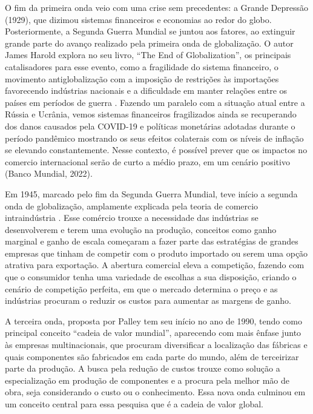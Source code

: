 \documentclass[12pt]{article}
\begin{document}
O fim da primeira onda veio com uma crise sem precedentes: a Grande Depressão (1929), que dizimou sistemas financeiros e economias ao redor do globo. Posteriormente, a Segunda Guerra Mundial se juntou aos fatores, ao extinguir grande parte do avanço realizado pela primeira onda de globalização. O autor James Harold explora no seu livro, “The End of Globalization”, os principais catalisadores para esse evento, como a fragilidade do sistema financeiro, o movimento antiglobalização com a imposição de restrições às importações favorecendo indústrias nacionais e a dificuldade em manter relações entre os países em períodos de guerra \cite{harold02}. 
Fazendo um paralelo com a situação atual entre a Rússia e Ucrânia, vemos sistemas financeiros fragilizados ainda se recuperando dos danos causados pela COVID-19 e políticas monetárias adotadas durante o período pandêmico mostrando os seus efeitos colaterais com os níveis de inflação se elevando constantemente. Nesse contexto, é possível prever que os impactos no comercio internacional serão de curto a médio prazo, em um cenário positivo (Banco Mundial, 2022).

Em 1945, marcado pelo fim da Segunda Guerra Mundial, teve início a segunda onda de globalização, amplamente explicada pela teoria de comercio intraindústria \cite{palley2018three}. Esse comércio trouxe a necessidade das indústrias se desenvolverem e terem uma evolução na produção, conceitos como ganho marginal e ganho de escala começaram a fazer parte das estratégias de grandes empresas que tinham de competir com o produto importado ou serem uma opção atrativa para exportação. A abertura comercial eleva a competição, fazendo com que o consumidor tenha uma variedade de escolhas a sua disposição, criando o cenário de competição perfeita, em que o mercado determina o preço e as indústrias procuram o reduzir os custos para aumentar as margens de ganho.

A terceira onda, proposta por Palley tem seu início no ano de 1990, tendo como principal conceito “cadeia de valor mundial”, aparecendo com mais ênfase junto às empresas multinacionais, que procuram diversificar a localização das fábricas e quais componentes são fabricados em cada parte do mundo, além de terceirizar parte da produção. A busca pela redução de custos trouxe como solução a especialização em produção de componentes e a procura pela melhor mão de obra, seja considerando o custo ou o conhecimento. Essa nova onda culminou em um conceito central para essa pesquisa que é a cadeia de valor global. 
\end{document}
